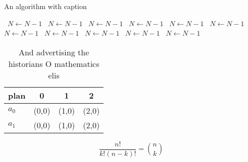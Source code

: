 \documentclass[a4paper]{article}
\begin{document}
\begin{algorithm}
\caption{An algorithm with caption}
\begin{algorithmic}
\    \State $N \gets N - 1$
\    \State $N \gets N - 1$
\    \State $N \gets N - 1$
\    \State $N \gets N - 1$
\    \State $N \gets N - 1$
\    \State $N \gets N - 1$
\    \State $N \gets N - 1$
\    \State $N \gets N - 1$
\    \State $N \gets N - 1$
\    \State $N \gets N - 1$
\    \State $N \gets N - 1$
\EndWhile
\end{algorithmic}
\end{algorithm}

\begin{table}
\begin{adjustbox}{width=0.6\columnwidth}
\begin{tabular}{|l|l|l|l|}
\hline
\textbf{plan} & \multicolumn{1}{c|}{\textbf{0}} & \multicolumn{1}{c|}{\textbf{1}} & \multicolumn{1}{c|}{\textbf{2}} \\ \hline
\textbf{$a_0$}  & (0,0) & (1,0) & (2,0) \\ \hline
\textbf{$a_1$}  & (0,0) & (1,0) & (2,0) \\ \hline
\end{tabular}
\end{adjustbox}
\caption{And advertising the historians O mathematics elis
}
\end{table}

\[ \frac{n!}{k!(n-k)!} = \binom{n}{k} \]
\end{document}
